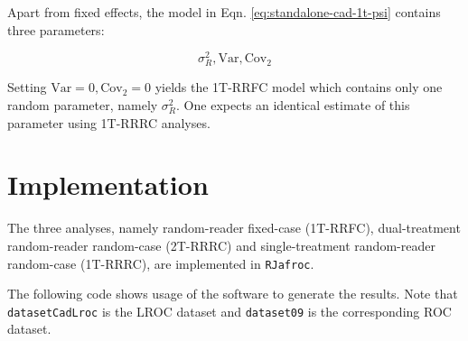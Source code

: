 \documentclass[
]{book}
\begin{document}
Apart from fixed effects, the model in Eqn. \eqref{eq:standalone-cad-1t-psi} contains three parameters:

\begin{equation}
\sigma_R^2, \text{Var}, \text{Cov}_2
\label{eq:standalone-cad-1t-parms}
\end{equation}

Setting \(\text{Var} = 0, \text{Cov}_2 = 0\) yields the 1T-RRFC model which contains only one random parameter, namely \(\sigma_R^2\). One expects an identical estimate of this parameter using 1T-RRRC analyses.

\hypertarget{standalone-cad-radiologists-computational-details}{%
\section{Implementation}\label{standalone-cad-radiologists-computational-details}}

The three analyses, namely random-reader fixed-case (1T-RRFC), dual-treatment random-reader random-case (2T-RRRC) and single-treatment random-reader random-case (1T-RRRC), are implemented in \texttt{RJafroc}.

The following code shows usage of the software to generate the results. Note that \texttt{datasetCadLroc} is the LROC dataset and \texttt{dataset09} is the corresponding ROC dataset.
\end{document}
